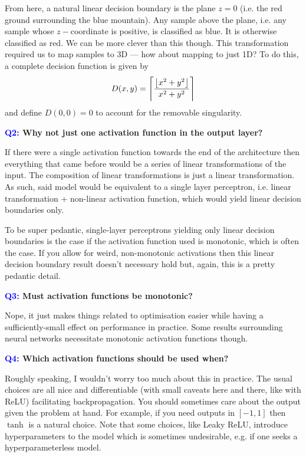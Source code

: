 \documentclass[11pt]{article}
\begin{document}
From here, a natural linear decision boundary is the plane $z=0$ (i.e. the red ground surrounding the blue mountain). Any sample above the plane, i.e. any sample whose $z-$coordinate is positive, is classified as blue. It is otherwise classified as red. We can be more clever than this though. This transformation required us to map samples to 3D — how about mapping to just 1D? To do this, a complete decision function is given by
$$
D(x,y)=\left\lceil\frac{\left\lfloor x^2+y^2\right\rfloor}{x^2+y^2}\right\rceil
$$
and define $D(0,0)=0$ to account for the removable singularity.

\begin{center}
    \textbf{\textcolor{blue}{Q2:} Why not just one activation function in the output layer?}
\end{center}
If there were a single activation function towards the end of the architecture then everything that came before would be a series of linear transformations of the input. The composition of linear transformations is just a linear transformation. As such, said model would be equivalent to a single layer perceptron, i.e. linear transformation + non-linear activation function, which would yield linear decision boundaries only.

To be super pedantic, single-layer perceptrons yielding only linear decision boundaries is the case if the activation function used is monotonic, which is often the case. If you allow for weird, non-monotonic activations then this linear decision boundary result doesn't necessary hold but, again, this is a pretty pedantic detail.

\begin{center}
    \textbf{\textcolor{blue}{Q3:} Must activation functions be monotonic?}
\end{center}
Nope, it just makes things related to optimisation easier while having a sufficiently-small effect on performance in practice. Some results surrounding neural networks necessitate monotonic activation functions though.

\begin{center}
    \textbf{\textcolor{blue}{Q4:} Which activation functions should be used when?}
\end{center}
Roughly speaking, I wouldn't worry too much about this in practice. The usual choices are all nice and differentiable (with small caveats here and there, like with ReLU) facilitating backpropagation. You should sometimes care about the output given the problem at hand. For example, if you need outputs in $[-1,1]$ then $\tanh$ is a natural choice. Note that some choices, like Leaky ReLU, introduce hyperparameters to the model which is sometimes undesirable, e.g. if one seeks a hyperparameterless model.
\end{document}
